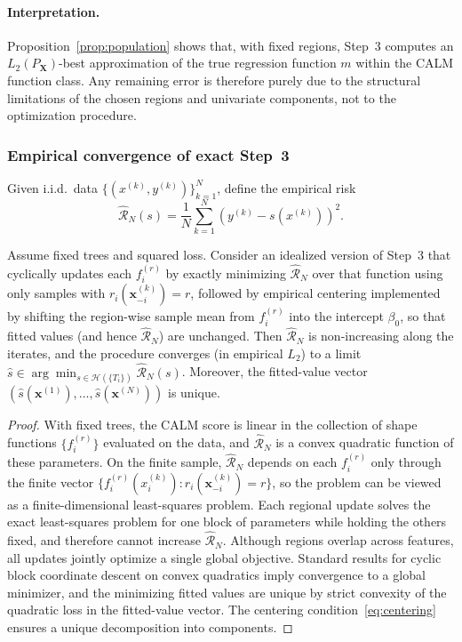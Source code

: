 \paragraph{Interpretation.}
Proposition~\ref{prop:population} shows that, with fixed regions, Step~3 computes an $L_2(P_{\mathbf{X}})$-best approximation of the true regression function $m$ within the
CALM function class.
Any remaining error is therefore purely due to the structural limitations of
the chosen regions and univariate components, not to the optimization procedure.

\subsubsection{Empirical convergence of exact Step~3}

Given i.i.d.\ data $\{(x^{(k)},y^{(k)})\}_{k=1}^N$, define the empirical risk
\[
\widehat{\mathcal R}_N(s)
=
\frac{1}{N}\sum_{k=1}^N (y^{(k)}-s(x^{(k)}))^2.
\]

\begin{proposition}
\label{prop:empirical}
Assume fixed trees and squared loss.
Consider an idealized version of Step~3 that cyclically updates each
$f_i^{(r)}$ by exactly minimizing $\widehat{\mathcal R}_N$ over that function
using only samples with $r_i(\mathbf{x}^{(k)}_{-i})=r$, followed by empirical centering implemented by shifting the region-wise sample mean from $f_i^{(r)}$ into the intercept $\beta_0$, so that fitted values (and hence $\widehat{\mathcal R}_N$) are unchanged.
Then $\widehat{\mathcal R}_N$ is non-increasing along the iterates, and the
procedure converges (in empirical $L_2$) to a limit $\hat s\in\arg\min_{s\in\mathcal H(\{T_i\})}\widehat{\mathcal R}_N(s)$.
Moreover, the fitted-value vector $(\hat s(\mathbf{x}^{(1)}),\ldots,\hat s(\mathbf{x}^{(N)}))$ is unique.
\end{proposition}

\begin{proof}
With fixed trees, the CALM score is linear in the collection of shape functions
$\{f_i^{(r)}\}$ evaluated on the data, and $\widehat{\mathcal R}_N$ is a convex
quadratic function of these parameters.
On the finite sample, $\widehat{\mathcal R}_N$ depends on each $f_i^{(r)}$ only through the finite vector
$\{f_i^{(r)}(x_i^{(k)}): r_i(\mathbf{x}_{-i}^{(k)})=r\}$, so the problem can be viewed as a finite-dimensional least-squares problem.
Each regional update solves the exact least-squares problem for one block of
parameters while holding the others fixed, and therefore cannot increase
$\widehat{\mathcal R}_N$.
Although regions overlap across features, all updates jointly optimize a single
global objective.
Standard results for cyclic block coordinate descent on convex quadratics imply
convergence to a global minimizer, and the minimizing fitted values are unique by strict convexity of the quadratic loss in the fitted-value vector.
The centering condition~\eqref{eq:centering} ensures a unique decomposition into components.
\end{proof}

